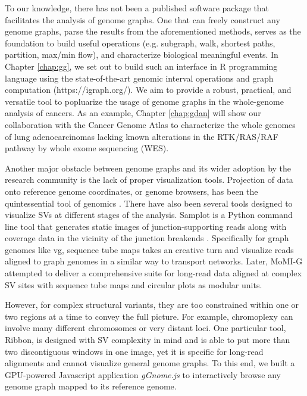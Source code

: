\documentclass[phd,tocprelim]{cornell}
\begin{document}
To our knowledge, there has not been a published software package that facilitates the analysis of genome graphs. One that can freely construct any genome graphs, parse the results from the aforementioned methods, serves as the foundation to build useful operations (e.g. subgraph, walk, shortest paths, partition, max/min flow), and characterize biological meaningful events. In Chapter \ref{chap:gg}, we set out to build such an interface in R programming language using the state-of-the-art genomic interval operations \cite{Lawrence2013-lh} and graph computation (https://igraph.org/). We aim to provide a robust, practical, and versatile tool to popluarize the usage of genome graphs in the whole-genome analysis of cancers. As an example, Chapter \ref{chap:gdan} will show our collaboration with the Cancer Genome Atlas to characterize the whole genomes of lung adenocarcinomas lacking known alterations in the RTK/RAS/RAF pathway by whole exome sequencing (WES).

Another major obstacle between genome graphs and its wider adoption by the research community is the lack of proper visualization tools. Projection of data onto reference genome coordinates, or genome browsers, has been the quintessential tool of genomics \cite{Robinson2011-ra,kent2002-ke}. There have also been several tools designed to visualize SVs at different stages of the analysis. Samplot is a Python command line tool that generates static images of junction-supporting reads along with coverage data in the vicinity of the junction breakends \cite{Belyeu2021-tm}. Specifically for graph genomes like vg, sequence tube maps \cite{Beyer2019-nb} takes an creative turn and visualize reads aligned to graph genomes in a similar way to transport networks. Later, MoMI-G \cite{Yokoyama2019-xd} attempted to deliver a comprehensive suite for long-read data aligned at complex SV sites with sequence tube maps and circular plots as modular units.

However, for complex structural variants, they are too constrained within one or two regions at a time to convey the full picture. For example, chromoplexy can involve many different chromosomes or very distant loci. One particular tool, Ribbon\cite{Nattestad2016-dn,Nattestad2018-wl}, is designed with SV complexity in mind and is able to put more than two discontiguous windows in one image, yet it is specific for long-read alignments and cannot visualize general genome graphs. To this end, we built a GPU-powered Javascript application \textit{gGnome.js} to interactively browse any genome graph mapped to its reference genome.
\end{document}
